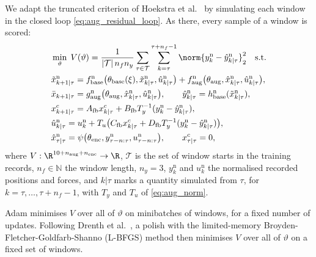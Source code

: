 We adapt the truncated criterion of Hoekstra et
al.~\cite[Eq.~(22)]{hoekstra2026lfr} by simulating each window in the closed
loop \eqref{eq:aug_residual_loop}.
As there, every sample of a window is scored:
{\small
\begin{equation}
\begin{aligned}
 &\min_{\vartheta}\;V(\vartheta)
  =\frac{1}{|\mathcal T|\,n_fn_y}\sum_{\tau\in\mathcal T}
   \sum_{k=\tau}^{\tau+n_f-1}
   \norm{y^{\mathrm n}_k-\hat y^{\mathrm n}_{k|\tau}}_2^2
  \quad\text{s.t.}\\
 &\tilde x^{\mathrm n}_{k+1|\tau}
  =f^{\mathrm n}_{\mathrm{base}}\bigl(\theta_{\mathrm{base}}(\xi),
   \tilde x^{\mathrm n}_{k|\tau},\hat u^{\mathrm n}_{k|\tau}\bigr)
  +f^{\mathrm n}_{\mathrm{aug}}\bigl(\theta_{\mathrm{aug}},
   \hat x^{\mathrm n}_{k|\tau},\hat u^{\mathrm n}_{k|\tau}\bigr),\\
 &\bar x_{k+1|\tau}
  =g^{\mathrm n}_{\mathrm{aug}}\bigl(\theta_{\mathrm{aug}},
   \hat x^{\mathrm n}_{k|\tau},\hat u^{\mathrm n}_{k|\tau}\bigr),
  \qquad
  \hat y^{\mathrm n}_{k|\tau}=h^{\mathrm n}_{\mathrm{base}}
   (\tilde x^{\mathrm n}_{k|\tau}),\\
 &x^c_{k+1|\tau}=A_{\mathrm{fb}}x^c_{k|\tau}
  +B_{\mathrm{fb}}T_y^{-1}(y^{\mathrm n}_k-\hat y^{\mathrm n}_{k|\tau}),\\
 &\hat u^{\mathrm n}_{k|\tau}=u^{\mathrm n}_k
  +T_u\bigl(C_{\mathrm{fb}}x^c_{k|\tau}
  +D_{\mathrm{fb}}T_y^{-1}(y^{\mathrm n}_k-\hat y^{\mathrm n}_{k|\tau})\bigr),\\
 &\hat x^{\mathrm n}_{\tau|\tau}=\psi\bigl(\theta_{\mathrm{enc}},
   y^{\mathrm n}_{\tau-n:\tau},u^{\mathrm n}_{\tau-n:\tau}\bigr),
  \qquad x^c_{\tau|\tau}=0,
\end{aligned}
\label{eq:aug_loss}
\end{equation}
}
where $V:\R^{10+n_{\mathrm{aug}}+n_{\mathrm{enc}}}\to\R$, $\mathcal T$ is the
set of window starts in the training records, $n_f\in\mathbb N$ the window
length, $n_y=3$, $y^{\mathrm n}_k$ and $u^{\mathrm n}_k$ the normalised recorded
positions and forces, and $k|\tau$ marks a quantity simulated from $\tau$, for
$k=\tau,\dots,\tau+n_f-1$, with $T_y$ and $T_u$ of \eqref{eq:aug_norm}.

Adam minimises $V$ over all of $\vartheta$ on minibatches of windows, for a
fixed number of updates.
Following Drenth et al.~\cite[Sec.~5]{drenth2025lpvlfr}, a polish with the
limited-memory Broyden-Fletcher-Goldfarb-Shanno (L-BFGS) method then minimises
$V$ over all of $\vartheta$ on a fixed set of windows.

